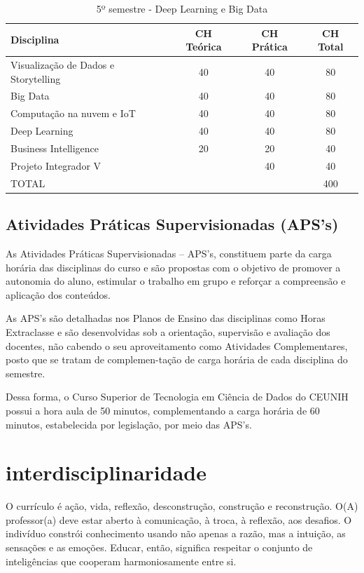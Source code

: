 \documentclass[a4paper, 12pt, openright, oneside, german, french, english, brazil]{abntex2}
\begin{document}
\begin{table}[!h]
  \centering
  \footnotesize
  \caption{5º semestre - Deep Learning e Big Data}
  \label{5sem}
  \begin{tabular}{|p{6cm}|c|c|c|}
    \hline
    \textbf{Disciplina} & CH Teórica & CH Prática & CH Total \\
    \hline
    Visualização de Dados e Storytelling & 40 & 40 & 80 \\
    \hline
    Big Data & 40 & 40 & 80 \\
    \hline
    Computação na nuvem e IoT & 40 & 40 & 80 \\
    \hline
    Deep Learning & 40 & 40 & 80 \\
    \hline
    Business Intelligence & 20 & 20 & 40 \\
    \hline
    Projeto Integrador V & & 40 & 40 \\
    \hline
    TOTAL & & & 400 \\
    \hline
  \end{tabular}
\end{table}

\newpage

\section{Atividades Práticas Supervisionadas (APS's)}

As Atividades Práticas Supervisionadas – APS's, constituem parte da carga horária das disciplinas do curso e são propostas com o objetivo de promover a autonomia do aluno, estimular o trabalho em grupo e reforçar a compreensão e aplicação dos conteúdos.

As APS's são detalhadas nos Planos de Ensino das disciplinas como Horas Extraclasse e são desenvolvidas sob a orientação, supervisão e avaliação dos docentes, não cabendo o seu aproveitamento como Atividades Complementares, posto que se tratam de complemen-tação de carga horária de cada disciplina do semestre.

Dessa forma, o Curso Superior de Tecnologia em Ciência de Dados do CEUNIH possui a hora aula de 50 minutos, complementando a carga horária de 60 minutos, estabelecida por legislação, por meio das APS's.

\chapter{interdisciplinaridade}

O currículo é ação, vida, reflexão, desconstrução, construção e reconstrução. O(A) professor(a) deve estar aberto à comunicação, à troca, à reflexão, aos desafios. O indivíduo constrói conhecimento usando não apenas a razão, mas a intuição, as sensações e as emoções. Educar, então, significa respeitar o conjunto de inteligências que cooperam harmoniosamente entre si.
\end{document}
